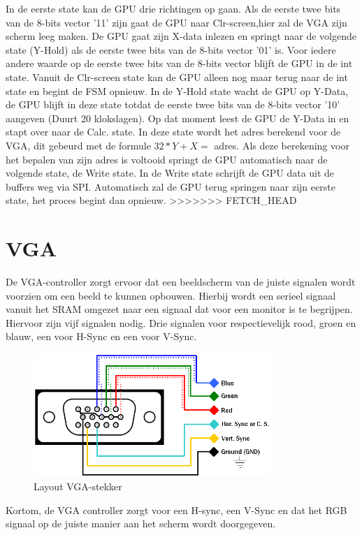 \documentclass[oneside,dutch]{tudelft-report}
\begin{document}
In de eerste state kan de GPU drie richtingen op gaan. Als de eerste twee bits van de 8-bits vector '11' zijn gaat de GPU naar Clr-screen,hier zal de VGA zijn scherm leeg maken. De GPU gaat zijn X-data inlezen en springt naar de volgende state (Y-Hold) als de eerste twee bits van de 8-bits vector '01' is. Voor iedere andere waarde op de eerste twee bits van de 8-bits vector blijft de GPU in de int state. Vanuit de Clr-screen state kan de GPU alleen nog maar terug naar de int state en begint de FSM opnieuw. In de Y-Hold state wacht de GPU op Y-Data, de GPU blijft in deze state totdat de eerste twee bits van de 8-bits vector '10' aangeven (Duurt 20 klokslagen). Op dat moment leest de GPU de Y-Data in en stapt over naar de Calc. state. In deze state wordt het adres berekend voor de VGA, dit gebeurd met de formule $32*Y+X =$ adres. Als deze berekening voor het bepalen van zijn adres is voltooid springt de GPU automatisch naar de volgende state, de Write state. In de Write state schrijft de GPU data uit de buffers weg via SPI. Automatisch zal de GPU terug springen naar zijn eerste state, het proces begint dan opnieuw. 
>>>>>>> FETCH_HEAD

\chapter{VGA}
De VGA-controller zorgt ervoor dat een beeldscherm van de juiste signalen wordt voorzien om een beeld te kunnen opbouwen. Hierbij wordt een serieel signaal vanuit het SRAM omgezet naar een signaal dat voor een monitor is te begrijpen. Hiervoor zijn vijf signalen nodig. Drie signalen voor respectievelijk rood, groen en blauw, een voor H-Sync en een voor V-Sync. 

\begin{figure}[H]
\center
\includegraphics[width=9cm]{vga2arcade}
\caption{Layout VGA-stekker}
\label{VGA}
\end{figure}

Kortom, de VGA controller zorgt voor een H-sync, een V-Sync en dat het RGB signaal op de juiste manier aan het scherm wordt doorgegeven. 
\end{document}
